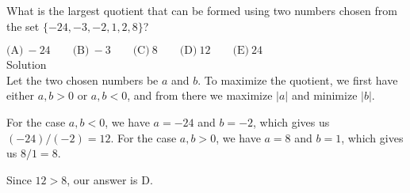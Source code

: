 

What is the largest quotient that can be formed using two numbers chosen from the set $\{ -24, -3, -2, 1, 2, 8 \}$?

$\text{(A)}\ -24 \qquad \text{(B)}\ -3 \qquad \text{(C)}\ 8 \qquad \text{(D)}\ 12 \qquad \text{(E)}\ 24$
\\
Solution
\\
Let the two chosen numbers be $a$ and $b$. To maximize the quotient, we first have either $a,b>0$ or $a,b<0$, and from there we maximize $|a|$ and minimize $|b|$.

For the case $a,b<0$, we have $a=-24$ and $b=-2$, which gives us $(-24)/(-2)=12$. For the case $a,b>0$, we have $a=8$ and $b=1$, which gives us $8/1=8$.

Since $12>8$, our answer is $\boxed{\text{D}}$.
